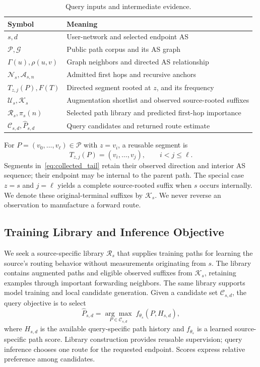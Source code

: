 \documentclass[sigconf,anonymous,review]{acmart}
\begin{document}
\begin{table}[t]
\centering
\caption{Query inputs and intermediate evidence.}
\label{tab:notation}
\footnotesize
\begin{tabularx}{\columnwidth}{@{}lX@{}}
\toprule
Symbol & Meaning\\
\midrule
$s,d$ & User-network and selected endpoint AS\\
$\mathcal P,\mathcal G$ & Public path corpus and its AS graph\\
$\Gamma(u),\rho(u,v)$ & Graph neighbors and directed AS relationship\\
$\mathcal N_s,\mathcal A_{s,n}$ & Admitted first hops and recursive anchors\\
$T_{z,j}(P),F(T)$ & Directed segment rooted at $z$, and its frequency\\
$\mathcal U_s,\mathcal K_s$ & Augmentation shortlist and observed source-rooted suffixes\\
$\mathcal R_s,\pi_s(n)$ & Selected path library and predicted first-hop importance\\
$\mathcal C_{s,d},\widehat P_{s,d}$ & Query candidates and returned route estimate\\
\bottomrule
\end{tabularx}
\end{table}

For $P=(v_0,\ldots,v_\ell)\in\mathcal P$ with $z=v_i$, a reusable segment is
\begin{equation}
T_{z,j}(P)=(v_i,\ldots,v_j),\qquad i<j\leq\ell.
\label{eq:collected_tail}
\end{equation}
Segments in~\eqref{eq:collected_tail} retain their observed direction and
interior AS sequence; their endpoint may be internal to the parent path.
The special case $z=s$ and $j=\ell$ yields a complete source-rooted suffix
when $s$ occurs internally. We denote these original-terminal suffixes by
$\mathcal K_s$. We never reverse an observation to manufacture a forward
route.

\subsection{Training Library and Inference Objective}

We seek a source-specific library $\mathcal R_s$ that supplies training
paths for learning the source's routing behavior without measurements
originating from $s$. The library contains augmented paths and eligible
observed suffixes from $\mathcal K_s$, retaining examples through important
forwarding neighbors. The same library supports model training and local
candidate generation. Given a candidate set $\mathcal C_{s,d}$, the query
objective is to select
\begin{equation}
\widehat P_{s,d}
=\underset{P\in\mathcal C_{s,d}}{\arg\max}\; f_{\theta_s}(P,H_{s,d}),
\label{eq:downstream_inference}
\end{equation}
where $H_{s,d}$ is the available query-specific path history and
$f_{\theta_s}$ is a learned source-specific path score. Library construction
provides reusable supervision; query inference chooses one route for the
requested endpoint. Scores express relative preference among candidates.
\end{document}
